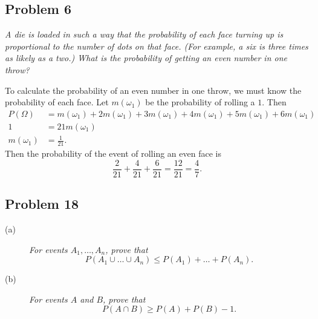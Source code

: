 \documentclass{tufte-handout}
\begin{document}
\subsection{Problem 6}
\begin{description}
\item \textit{A die is loaded in such a way that the probability of
    each face turning up is proportional to the number of dots on that
    face. (For example, a six is three times as likely as a two.) What
    is the probability of getting an even number in one throw?}
\end{description}

To calculate the probability of an even number in one throw, we must
know the probability of each face. Let $m(\omega_1)$ be the probability of
rolling a $1$. Then
\begin{align*}
  P(\Omega) &= m(\omega_1) + 2m(\omega_1) + 3m(\omega_1) + 4m(\omega_1) +
  5m(\omega_1) + 6m(\omega_1)\\
  1 &= 21m(\omega_1)\\
  m(\omega_1) &= \frac{1}{21}.
\end{align*}
Then the probability of the event of rolling an even face is
\[\frac{2}{21} + \frac{4}{21} + \frac{6}{21} = \frac{12}{21} =
\frac{4}{7}.\]

\subsection{Problem 18}
\begin{description}
\item[(a)] \textit{For events $A_1,\dots, A_n$, prove that
  \[
  P(A_1 \cup \dots \cup A_n) \leq P(A_1) + \dots + P(A_n).
  \]}
\item[(b)] \textit{For events $A$ and $B$, prove that
  \[
  P(A \cap B) \geq P(A) + P(B) - 1.
  \]}
\end{description}
\end{document}
